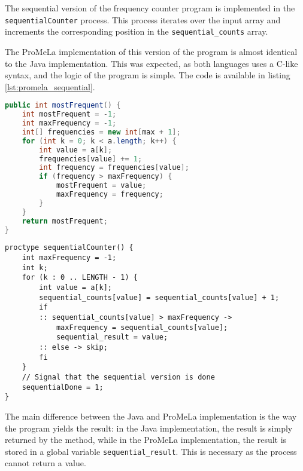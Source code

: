 \documentclass[a4paper, 11pt]{article}
\begin{document}
The sequential version of the frequency counter program is implemented in the \texttt{sequentialCounter} process. This process iterates over the input array and increments the corresponding position in the \texttt{sequential\_counts} array.

The ProMeLa implementation of this version of the program is almost identical to the Java implementation. This was expected, as both languages uses a C-like syntax, and the logic of the program is simple. The code is available in listing \ref{lst:promela_sequential}.

\begin{minipage}[t]{0.45\textwidth}
	\begin{lstlisting}[language=Java, caption={Java sequential version of the frequency counter program}, captionpos=b, label={lst:java_frequency}]
public int mostFrequent() {
    int mostFrequent = -1;
    int maxFrequency = -1;
    int[] frequencies = new int[max + 1];
    for (int k = 0; k < a.length; k++) {
        int value = a[k];
        frequencies[value] += 1;
        int frequency = frequencies[value];
        if (frequency > maxFrequency) {
            mostFrequent = value;
            maxFrequency = frequency;
        }
    }
    return mostFrequent;
}

  \end{lstlisting}
\end{minipage}\hfill
\begin{minipage}[t]{0.45\textwidth}
	\begin{lstlisting}[language=Promela, caption={ProMeLa sequential version of the frequency counter program}, captionpos=b, breaklines=true, label={lst:promela_sequential}]
proctype sequentialCounter() {
    int maxFrequency = -1;
    int k;
    for (k : 0 .. LENGTH - 1) {
        int value = a[k];
        sequential_counts[value] = sequential_counts[value] + 1;
        if
        :: sequential_counts[value] > maxFrequency -> 
            maxFrequency = sequential_counts[value];
            sequential_result = value;
        :: else -> skip;
        fi
    }
    // Signal that the sequential version is done
    sequentialDone = 1;
}
  \end{lstlisting}
\end{minipage}

\noindent The main difference between the Java and ProMeLa implementation is the way the program yields the result: in the Java implementation, the result is simply returned by the method, while in the ProMeLa implementation, the result is stored in a global variable \texttt{sequential\_result}. This is necessary as the process cannot return a value.
\end{document}

